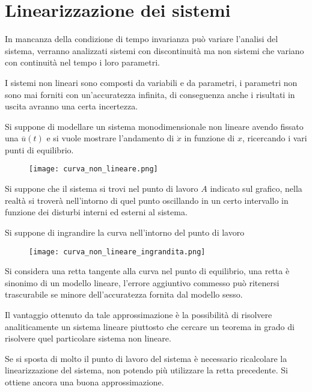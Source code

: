 
\section{Linearizzazione dei sistemi}
In mancanza della condizione di tempo invarianza può variare l'analisi del
sistema, verranno analizzati sistemi con discontinuità ma non sistemi che
variano con continuità nel tempo i loro parametri.

I sistemi non lineari sono composti da variabili e da parametri, i parametri
non sono mai forniti con un'accuratezza infinita, di conseguenza anche i
risultati in uscita avranno una certa incertezza.

Si suppone di modellare un sistema monodimensionale non lineare avendo fissato
una $\overline{u}(t)$ e si vuole mostrare l'andamento di $\dot x$ in funzione
di $x$, ricercando i vari punti di equilibrio.

\begin{figure}[h]
 \centering
 \texttt{[image: curva\_non\_lineare.png]}
 \label{Fig.:curva_non_lineare}
\end{figure}

Si suppone che il sistema si trovi nel punto di lavoro $A$ indicato sul
grafico, nella realtà si troverà nell'intorno di quel punto oscillando in un
certo intervallo in funzione dei disturbi interni ed esterni al sistema.

Si suppone di ingrandire la curva nell'intorno del punto di lavoro

\begin{figure}[h]
 \centering
 \texttt{[image: curva\_non\_lineare\_ingrandita.png]}
 \label{Fig.:curva_non_lineare_ingrandita}
\end{figure}
Si considera una retta tangente alla curva nel punto di equilibrio, una retta è
sinonimo di un modello lineare, l'errore aggiuntivo commesso può ritenersi
trascurabile se minore dell'accuratezza fornita dal modello sesso.

Il vantaggio ottenuto da tale approssimazione è la possibilità di risolvere
analiticamente un sistema lineare piuttosto che cercare un teorema in grado di
risolvere quel particolare sistema non lineare.

Se si sposta di molto il punto di lavoro del sistema è necessario ricalcolare
la linearizzazione del sistema, non potendo più utilizzare la retta precedente.
Si ottiene ancora una buona approssimazione.

